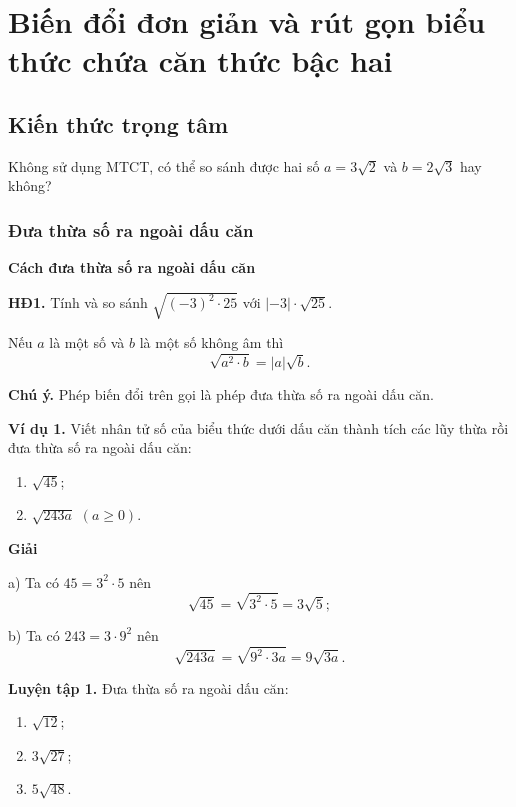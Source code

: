 \section{Biến đổi đơn giản và rút gọn biểu thức chứa căn thức bậc hai}

\begin{lesson}
    \subsection{Kiến thức trọng tâm}

    Không sử dụng MTCT, có thể so sánh được hai số $a=3\sqrt{2}$ và $b=2\sqrt{3}$ hay không?

    \answerline

    \subsubsection{Đưa thừa số ra ngoài dấu căn}

    \textbf{Cách đưa thừa số ra ngoài dấu căn}

    \textbf{HĐ1.} Tính và so sánh $\sqrt{(-3)^2\cdot25}$ với $|-3|\cdot\sqrt{25}$.

    \answerline

    \begin{keyconcept}
        Nếu $a$ là một số và $b$ là một số không âm thì
        \[
            \sqrt{a^2\cdot b}=|a|\sqrt{b}.
        \]
    \end{keyconcept}

    \textbf{Chú ý.} Phép biến đổi trên gọi là phép đưa thừa số ra ngoài dấu căn.

    \textbf{Ví dụ 1.} Viết nhân tử số của biểu thức dưới dấu căn thành tích các lũy thừa rồi đưa thừa số ra ngoài dấu căn:
    \begin{enumerate}[label=\alph*)]
        \item $\sqrt{45}$;
        \item $\sqrt{243a}$ $(a\ge0)$.
    \end{enumerate}

    \textbf{Giải}

    a) Ta có $45=3^2\cdot5$ nên
    \[
        \sqrt{45}=\sqrt{3^2\cdot5}=3\sqrt5;
    \]

    b) Ta có $243=3\cdot9^2$ nên
    \[
        \sqrt{243a}=\sqrt{9^2\cdot3a}=9\sqrt{3a}.
    \]

    \textbf{Luyện tập 1.} Đưa thừa số ra ngoài dấu căn:
    \begin{enumerate}[label=\alph*)]
        \item $\sqrt{12}$;
        \item $3\sqrt{27}$;
        \item $5\sqrt{48}$.
    \end{enumerate}


\end{lesson}
